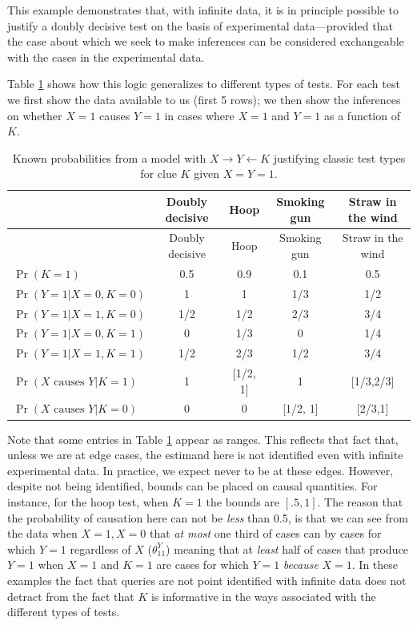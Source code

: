 \documentclass[
  12pt,
]{book}
\begin{document}
This example demonstrates that, with infinite data, it is in principle possible to justify a doubly decisive test on the basis of experimental data---provided that the case about which we seek to make inferences can be considered exchangeable with the cases in the experimental data.

Table \ref{tab:tests15} shows how this logic generalizes to different types of tests. For each test we first show the data available to us (first 5 rows); we then show the inferences on whether \(X=1\) causes \(Y=1\) in cases where \(X=1\) and \(Y=1\) as a function of \(K\).

\begin{longtable}[]{@{}lcccc@{}}
\caption{\label{tab:tests15}Known probabilities from a model with \(X \rightarrow Y \leftarrow K\) justifying classic test types for clue \(K\) given \(X=Y=1\).}\tabularnewline
\toprule
& Doubly decisive & Hoop & Smoking gun & Straw in the wind \\
\midrule
\endfirsthead
\toprule
& Doubly decisive & Hoop & Smoking gun & Straw in the wind \\
\midrule
\endhead
\(\Pr(K = 1)\) & 0.5 & 0.9 & 0.1 & 0.5 \\
\(\Pr(Y=1 \vert X=0, K = 0)\) & 1 & 1 & 1/3 & 1/2 \\
\(\Pr(Y=1 \vert X=1, K = 0)\) & 1/2 & 1/2 & 2/3 & 3/4 \\
\(\Pr(Y=1 \vert X=0, K = 1)\) & 0 & 1/3 & 0 & 1/4 \\
\(\Pr(Y=1 \vert X=1, K = 1)\) & 1/2 & 2/3 & 1/2 & 3/4 \\
\(\Pr(X \text{  causes }Y \vert K=1)\) & 1 & {[}1/2, 1{]} & 1 & {[}1/3,2/3{]} \\
\(\Pr(X \text{  causes }Y \vert K=0)\) & 0 & 0 & {[}1/2, 1{]} & {[}2/3,1{]} \\
\bottomrule
\end{longtable}

Note that some entries in Table \ref{tab:tests15} appear as ranges. This reflects that fact that, unless we are at edge cases, the estimand here is not identified even with infinite experimental data. In practice, we expect never to be at these edges. However, despite not being identified, bounds can be placed on causal quantities. For instance, for the hoop test, when \(K=1\) the bounds are \([.5,1]\). The reason that the probability of causation here can not be \emph{less} than 0.5, is that we can see from the data when \(X=1, X=0\) that \emph{at most} one third of cases can by cases for which \(Y=1\) regardless of \(X\) (\(\theta^Y_{11}\)) meaning that at \emph{least} half of cases that produce \(Y=1\) when \(X=1\) and \(K=1\) are cases for which \(Y=1\) \emph{because} \(X=1\). In these examples the fact that queries are not point identified with infinite data does not detract from the fact that \(K\) is informative in the ways associated with the different types of tests.
\end{document}

